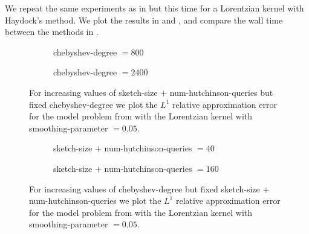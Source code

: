 We repeat the same experiments as in 
but this time for a Lorentzian kernel with Haydock's method. We
plot the results in  and
, and compare the wall time
between the methods in .\\

\begin{figure}[ht]
    \begin{subfigure}[b]{0.49\columnwidth}
        
        \caption{\gls{chebyshev-degree} $=800$}
        \label{fig:5-experiments-haydock-convergence-nv-m800}
    \end{subfigure}
    \begin{subfigure}[b]{0.49\columnwidth}
        
        \caption{\gls{chebyshev-degree} $=2400$}
        \label{fig:5-experiments-haydock-convergence-nv-m2400}
    \end{subfigure}
    \caption{For increasing values of \gls{sketch-size} $+$ \gls{num-hutchinson-queries}
    but fixed \gls{chebyshev-degree} we plot the $L^1$ relative approximation error 
    for the model problem from  with
    the Lorentzian kernel with \gls{smoothing-parameter} $=0.05$.}
    \label{fig:5-experiments-haydock-convergence-nv}
\end{figure}

\begin{figure}[ht]
    \centering
    \begin{subfigure}[b]{0.49\columnwidth}
        
        \caption{\gls{sketch-size} $+$ \gls{num-hutchinson-queries} $=40$}
        \label{fig:5-experiments-haydock-convergence-m-nv40}
    \end{subfigure}
    \begin{subfigure}[b]{0.49\columnwidth}
        
        \caption{\gls{sketch-size} $+$ \gls{num-hutchinson-queries} $=160$}
        \label{fig:5-experiments-haydock-convergence-m-nv160}
    \end{subfigure}
    \caption{For increasing values of \gls{chebyshev-degree} but fixed
    \gls{sketch-size} $+$ \gls{num-hutchinson-queries} we plot the $L^1$ relative
    approximation error 
    for the model problem from  with
    the Lorentzian kernel with \gls{smoothing-parameter} $=0.05$.}
    \label{fig:5-experiments-haydock-convergence-m}
\end{figure}

